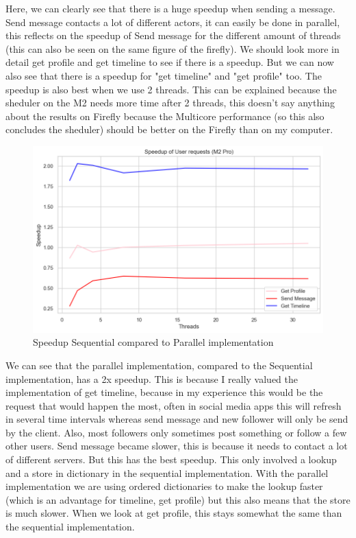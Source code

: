 \documentclass[a4paper]{article}
\begin{document}
Here, we can clearly see that there is a huge speedup when sending a message. Send message contacts a lot of different actors, it can easily be done in parallel, this reflects on the speedup of Send message for the different amount of threads (this can also be seen on the same figure of the firefly). We should look more in detail get profile and get timeline to see if there is a speedup. But we can now also see that there is a speedup for "get timeline" and "get profile" too. The speedup is also best when we use 2 threads. This can be explained because the sheduler on the M2 needs more time after 2 threads, this doesn't say anything about the results on Firefly because the Multicore performance (so this also concludes the sheduler) should be better on the Firefly than on my computer. 
\begin{figure}[H]
	\centering
	\includegraphics[width = \linewidth]{Images/SpeedupSeq.png}
	\caption{Speedup Sequential compared to Parallel implementation}
\end{figure}
We can see that the parallel implementation, compared to the Sequential implementation, has a 2x speedup. This is because I really valued the implementation of get timeline, because in my experience this would be the request that would happen the most, often in social media apps this will refresh in several time intervals whereas send message and new follower will only be send by the client. Also, most followers only sometimes post something or follow a few other users. Send message became slower, this is because it needs to contact a lot of different servers. But this has the best speedup. This only involved a lookup and a store in dictionary in the sequential implementation. With the parallel implementation we are using ordered dictionaries to make the lookup faster (which is an advantage for timeline, get profile) but this also means that the store is much slower. When we look at get profile, this stays somewhat the same than the sequential implementation.   
\end{document}
